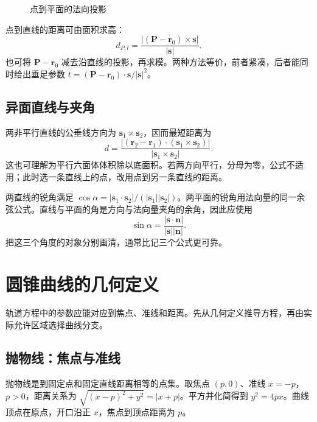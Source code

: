 \documentclass[11pt,openany,fontset=fandol]{ctexbook}
\theoremstyle{plain}\newtheorem{theorem}{定理}[chapter]\newtheorem{proposition}[theorem]{命题}
\theoremstyle{definition}\newtheorem{definition}{定义}[chapter]\newtheorem{example}{例}[chapter]
\theoremstyle{remark}\newtheorem*{remark}{说明}
\newcommand{\vct}[1]{\bm{#1}}\newcommand{\Rea}{\operatorname{Re}}\newcommand{\Ima}{\operatorname{Im}}
\begin{document}
\begin{figure}[htbp]
\centering
{}
\caption{点到平面的法向投影}\label{fig:plane-distance}
\end{figure}

点到直线的距离可由面积求高：
\begin{equation}
d_{P,l}=\frac{|(\vct P-\vct r_0)\times\vct s|}{|\vct s|}.
\end{equation}
也可将 $\vct P-\vct r_0$ 减去沿直线的投影，再求模。两种方法等价，前者紧凑，后者能同时给出垂足参数 $t=(\vct P-\vct r_0)\cdot\vct s/|\vct s|^2$。

\subsection{异面直线与夹角}
两非平行直线的公垂线方向为 $\vct s_1\times\vct s_2$，因而最短距离为
\begin{equation}
d=\frac{|(\vct r_2-\vct r_1)\cdot(\vct s_1\times\vct s_2)|}{|\vct s_1\times\vct s_2|}.
\end{equation}
这也可理解为平行六面体体积除以底面积。若两方向平行，分母为零，公式不适用；此时选一条直线上的点，改用点到另一条直线的距离。

两直线的锐角满足 $\cos\alpha=|\vct s_1\cdot\vct s_2|/(|\vct s_1||\vct s_2|)$。两平面的锐角用法向量的同一余弦公式。直线与平面的角是方向与法向量夹角的余角，因此应使用
\begin{equation}
\sin\alpha=\frac{|\vct s\cdot\vct n|}{|\vct s||\vct n|}.
\end{equation}
把这三个角度的对象分别画清，通常比记三个公式更可靠。

\section{圆锥曲线的几何定义}
轨道方程中的参数应能对应到焦点、准线和距离。先从几何定义推导方程，再由实际允许区域选择曲线分支。

\subsection{抛物线：焦点与准线}
抛物线是到固定点和固定直线距离相等的点集。取焦点 $(p,0)$、准线 $x=-p$，$p>0$，距离关系为 $\sqrt{(x-p)^2+y^2}=|x+p|$。平方并化简得到 $y^2=4px$。曲线顶点在原点，开口沿正 $x$，焦点到顶点距离为 $p$。
\end{document}
